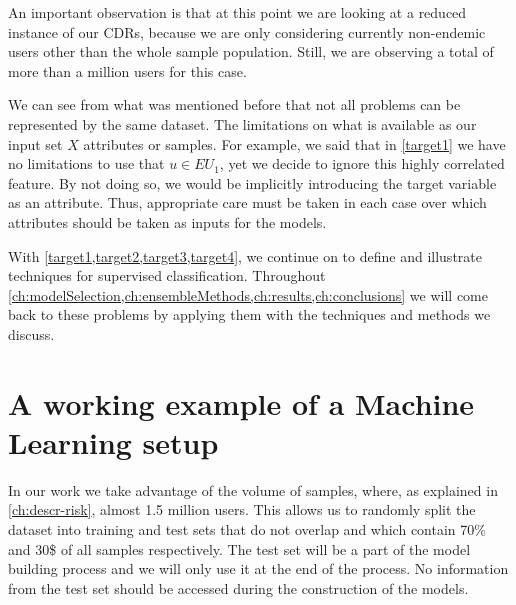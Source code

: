 An important observation is that at this point we are looking at a reduced instance of our CDRs, because we are only considering currently non-endemic users other than the whole sample population.
Still, we are observing a total of more than a million users for this case.






We can see from what was mentioned before that not all problems can be represented by the same dataset.
The limitations on what is available as our input set $X$ attributes or samples.
For example, we said that in \cref{target1} we have no limitations to use that $u \in EU_{1}$, yet we decide to ignore this highly correlated feature.
By not doing so, we  would be implicitly introducing the target variable as an attribute.
Thus, appropriate care must be taken in each case over which attributes should be taken as inputs for the models.


With \cref{target1,target2,target3,target4}, we continue on to define and illustrate techniques for supervised classification.
Throughout \cref{ch:modelSelection,ch:ensembleMethods,ch:results,ch:conclusions} we will come back to these problems by applying them with the techniques and methods we discuss.


\section{A working example of a Machine Learning setup}\label{section-example}

In our work we take advantage of the volume of samples, where, as explained in \cref{ch:descr-risk}, almost 1.5 million users.
This allows us to randomly split the dataset into training and test sets that do not overlap and which contain 70\% and 30\$ of all samples respectively.
The test set will be a part of the model building process and we will only use it at the end of the process.
No information from the test set should be accessed during the construction of the models.

